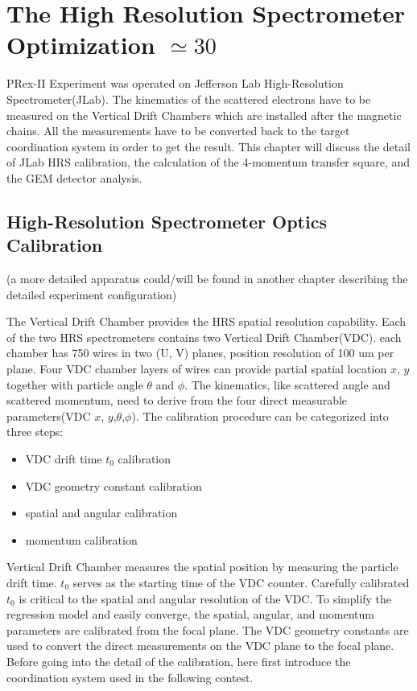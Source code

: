   \chapter{The High Resolution Spectrometer Optimization $\simeq 30$}

PRex-II Experiment was operated on Jefferson Lab High-Resolution Spectrometer(JLab). The kinematics of the scattered electrons have to be measured on the Vertical Drift Chambers which are installed after the magnetic chains. All the measurements have to be converted back to the target coordination system in order to get the result. This chapter will discuss the detail of JLab HRS calibration, the calculation of the 4-momentum transfer square, and the GEM detector analysis. 


\section{High-Resolution Spectrometer Optics Calibration}

(a more detailed apparatus could/will be found in another chapter describing the detailed experiment configuration)

The Vertical Drift Chamber provides the HRS spatial resolution capability. Each of the two HRS spectrometers contains two Vertical Drift Chamber(VDC). each chamber has 750 wires in two (U, V) planes, position resolution of 100 um per plane. Four VDC chamber layers of wires can provide partial spatial location $x$, $y$ together with particle angle $\theta$ and $\phi$. The kinematics, like scattered angle and scattered momentum, need to derive from the four direct measurable parameters(VDC $x$, $y$,$\theta$,$\phi$). The calibration procedure can be categorized into three steps:

\begin{itemize}
    \item VDC drift time $t_0$ calibration
    \item VDC geometry constant calibration 
    \item spatial and angular calibration
    \item momentum calibration
\end{itemize}

Vertical Drift Chamber measures the spatial position by measuring the particle drift time. $t_0$ serves as the starting time of the VDC counter. Carefully calibrated $t_0$ is critical to the spatial and angular resolution of the VDC. To simplify the regression model and easily converge, the spatial, angular, and momentum parameters are calibrated from the focal plane. The VDC geometry constants are used to convert the direct measurements on the VDC plane to the focal plane. Before going into the detail of the calibration, here first introduce the coordination system used in the following contest. 

